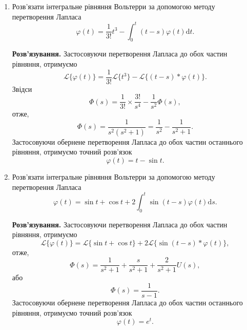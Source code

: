 \documentclass[14pt,twoside]{extreport}
\theoremstyle{mystyle}
\numberwithin{equation}{chapter}
\begin{document}
\begin{small}
\begin{enumerate}
		\item Розв'язати інтегральне рівняння Вольтерри за допомогою методу перетворення Лапласа
		\begin{equation*}
			\varphi(t)=\displaystyle \frac{1}{3!}t^{3}-\int_{0}^{t}(t-s)\varphi(t)\mathrm{d}t.
		\end{equation*}
		
		\textbf{Розв'язування.}
		Застосовуючи перетворення Лапласа до обох частин рівняння, отримуємо
		\begin{equation*}
			\displaystyle \mathcal{L}\{\varphi(t)\}=\frac{1}{3!}\mathcal{L}\{t^{3}\}-\mathcal{L}\{(t-s)*\varphi(t)\}.
		\end{equation*}
		Звідси
		\begin{equation*}
			\Phi(s)=\displaystyle \frac{1}{3!}\times\frac{3!}{s^{4}}-\frac{1}{s^{2}}\Phi(s),
		\end{equation*}
		отже,
		\begin{equation*}
			\Phi(s)=\displaystyle \frac{1}{s^{2}(s^{2}+1)}=\frac{1}{s^{2}}-\frac{1}{s^{2}+1}.
		\end{equation*}
		Застосовуючи обернене перетворення Лапласа до обох частин останнього рівняння, отримуємо точний розв'язок
		\begin{equation*}
			\varphi(t)=t-\sin t.
		\end{equation*}
		
		\item Розв'язати інтегральне рівняння Вольтерри за допомогою методу перетворення Лапласа
		\begin{equation*}
			\varphi(t)=\displaystyle \sin t+\cos t+2\int_{0}^{t}\sin(t-s)\varphi(t)\mathrm{d}s.
		\end{equation*}
		
		\textbf{Розв'язування.}
		Застосовуючи перетворення Лапласа до обох частин рівняння, отримуємо
		\begin{equation*}
			\mathcal{L}\{\varphi(t)\}=\mathcal{L}\{\sin t+\cos t\}+2\mathcal{L}\{\sin(t-s)*\varphi(t)\},
		\end{equation*}
		отже,
		\begin{equation*}
			\Phi(s)=\displaystyle \frac{1}{s^{2}+1}+\frac{s}{s^{2}+1}+\frac{2}{s^{2}+1}U(s),
		\end{equation*}
		або
		\begin{equation*}
			\Phi(s)=\displaystyle \frac{1}{s-1}.
		\end{equation*}
		Застосовуючи обернене перетворення Лапласа до обох частин останнього рівняння, отримуємо точний розв'язок
		\begin{equation*}
			\varphi(t)=e^{t}.
		\end{equation*}
	\end{enumerate}
\end{small}
\end{document}
